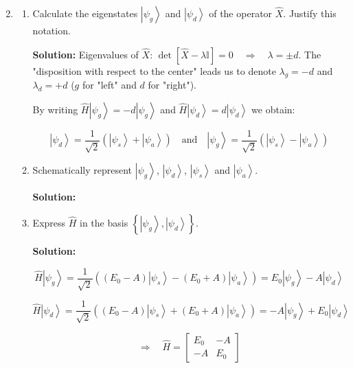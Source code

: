 \documentclass{article}
\begin{document}
\begin{enumerate}
\setcounter{enumi}{1}
    \item

    \begin{enumerate}
        \item Calculate the eigenstates $\left|\psi_{g}\right\rangle$ and $\left|\psi_{d}\right\rangle$ of the operator $\hat{X}$. Justify this notation.

        {\color{red}\textbf{Solution:} Eigenvalues of $\hat{X}$: $\det[\hat{X} - \lambda \mathbb{I}] = 0 \quad \Rightarrow \quad \lambda = \pm d$. The "disposition with respect to the center" leads us to denote $\lambda_{g} = -d$ and $\lambda_{d} = +d$ ($g$ for "left" and $d$ for "right").

        By writing $\hat{H}\left|\psi_{g}\right\rangle = -d\left|\psi_{g}\right\rangle$ and $\hat{H}\left|\psi_{d}\right\rangle = d\left|\psi_{d}\right\rangle$ we obtain:

        $$
        \left|\psi_{d}\right\rangle = \frac{1}{\sqrt{2}} \left(\left|\psi_{s}\right\rangle + \left|\psi_{a}\right\rangle\right) \quad \text{and} \quad \left|\psi_{g}\right\rangle = \frac{1}{\sqrt{2}} \left(\left|\psi_{s}\right\rangle - \left|\psi_{a}\right\rangle\right)
        $$}

        \item Schematically represent $\left|\psi_{g}\right\rangle$, $\left|\psi_{d}\right\rangle$, $\left|\psi_{s}\right\rangle$ and $\left|\psi_{a}\right\rangle$.

        {\color{red}\textbf{Solution:}}

        \item Express $\hat{H}$ in the basis $\left\{\left|\psi_{g}\right\rangle, \left|\psi_{d}\right\rangle\right\}$.

        {\color{red}\textbf{Solution:}

        $$
        \hat{H}\left|\psi_{g}\right\rangle = \frac{1}{\sqrt{2}} \left(\left(E_{0} - A\right)\left|\psi_{s}\right\rangle - \left(E_{0} + A\right)\left|\psi_{a}\right\rangle\right) = E_{0}\left|\psi_{g}\right\rangle - A\left|\psi_{d}\right\rangle
        $$

        $$
        \hat{H}\left|\psi_{d}\right\rangle = \frac{1}{\sqrt{2}} \left(\left(E_{0} - A\right)\left|\psi_{s}\right\rangle + \left(E_{0} + A\right)\left|\psi_{a}\right\rangle\right) = -A\left|\psi_{g}\right\rangle + E_{0}\left|\psi_{d}\right\rangle
        $$

        $$
        \Longrightarrow \quad \hat{H} = \begin{bmatrix}
        E_{0} & -A \\
        -A & E_{0}
        \end{bmatrix}
        $$

}
\end{enumerate}
\end{enumerate}
\end{document}

